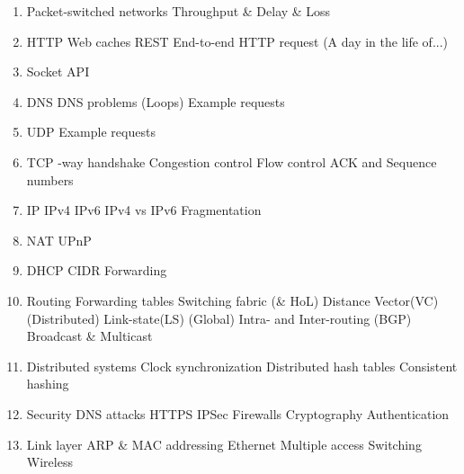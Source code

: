 \begin{enumerate}
    \item Packet-switched networks
        \subitem Throughput \& Delay \& Loss
    \item HTTP
        \subitem Web caches
        \subitem REST
        \subitem End-to-end HTTP request (A day in the life of...)
    \item Socket API
    \item DNS
        \subitem DNS problems (Loops)
        \subitem Example requests
    \item UDP
        \subitem Example requests
    \item TCP
        -way handshake
        \subitem Congestion control
        \subitem Flow control
        \subitem ACK and Sequence numbers
    \item IP
        \subitem IPv4
        \subitem IPv6
        \subitem IPv4 vs IPv6
        \subitem Fragmentation
    \item NAT
        \subitem UPnP
    \item DHCP
        \subitem CIDR
        \subitem Forwarding
    \item Routing
        \subitem Forwarding tables
        \subitem Switching fabric (\& HoL)
        \subitem Distance Vector(VC) (Distributed)
        \subitem Link-state(LS) (Global)
        \subitem Intra- and Inter-routing (BGP)
        \subitem Broadcast \& Multicast
    \item Distributed systems
        \subitem Clock synchronization
        \subitem Distributed hash tables
        \subitem Consistent hashing
    \item Security
        \subitem DNS attacks
        \subitem HTTPS
        \subitem IPSec
        \subitem Firewalls
        \subitem Cryptography
        \subitem Authentication
    \item Link layer
        \subitem ARP \& MAC addressing
        \subitem Ethernet
        \subitem Multiple access
        \subitem Switching
        \subitem Wireless
\end{enumerate}
